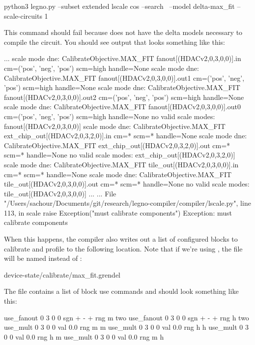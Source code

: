 \begin{snippet}
  python3 legno.py --subset extended lscale cos --search \
     --model delta-max_fit --scale-circuits 1
   \end{snippet}

This command should fail because \legno does not have the delta models
necessary to compile the circuit. You should see output that looks something
like this:

\begin{snippet}
  ...
  scale mode dne: CalibrateObjective.MAX_FIT fanout[(HDACv2,0,3,0,0)].in cm=('pos', 'neg', 'pos') scm=high handle=None
  scale mode dne: CalibrateObjective.MAX_FIT fanout[(HDACv2,0,3,0,0)].out1 cm=('pos', 'neg', 'pos') scm=high handle=None
  scale mode dne: CalibrateObjective.MAX_FIT fanout[(HDACv2,0,3,0,0)].out2 cm=('pos', 'neg', 'pos') scm=high handle=None
scale mode dne: CalibrateObjective.MAX_FIT fanout[(HDACv2,0,3,0,0)].out0 cm=('pos', 'neg', 'pos') scm=high handle=None
no valid scale modes: fanout[(HDACv2,0,3,0,0)]
scale mode dne: CalibrateObjective.MAX_FIT ext_chip_out[(HDACv2,0,3,2,0)].in cm=* scm=* handle=None
scale mode dne: CalibrateObjective.MAX_FIT ext_chip_out[(HDACv2,0,3,2,0)].out cm=* scm=* handle=None
no valid scale modes: ext_chip_out[(HDACv2,0,3,2,0)]
scale mode dne: CalibrateObjective.MAX_FIT tile_out[(HDACv2,0,3,0,0)].in cm=* scm=* handle=None
scale mode dne: CalibrateObjective.MAX_FIT tile_out[(HDACv2,0,3,0,0)].out cm=* scm=* handle=None
no valid scale modes: tile_out[(HDACv2,0,3,0,0)]
  ...
  ...
  File "/Users/sachour/Documents/git/research/legno-compiler/compiler/lscale.py", line 113, in scale
    raise Exception("must calibrate components")
Exception: must calibrate components
\end{snippet}

When this happens, the compiler also writes out a list of configured blocks to
calibrate and profile to the following location. Note that if we're using
\tx{delta-min_error}, the file will be named \tx{min_error.grendel} instead of :

\begin{snippet}
  device-state/calibrate/max_fit.grendel
\end{snippet}

The file contains a list of block use commands and should look something like
this:

\begin{snippet}
use_fanout 0 3 0 0  sgn + - + rng m two
use_fanout 0 3 0 0  sgn + - + rng h two
use_mult 0 3 0 0 val 0.0 rng m m
use_mult 0 3 0 0 val 0.0 rng h h
use_mult 0 3 0 0 val 0.0 rng h m
use_mult 0 3 0 0 val 0.0 rng m h
\end{snippet}


